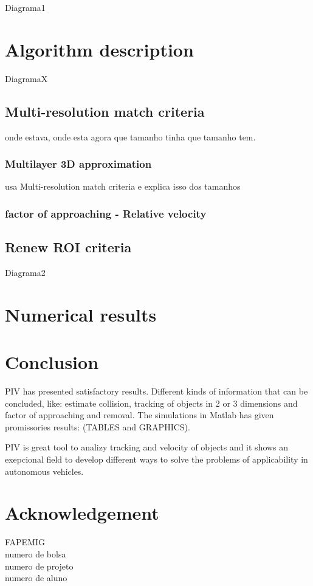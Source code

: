\documentclass[a4paper,10pt]{article}
\begin{document}
Diagrama1
\section{Algorithm description}
DiagramaX

\subsection{Multi-resolution match criteria}
onde estava, onde esta agora
que tamanho tinha que tamanho tem.
\subsubsection{Multilayer 3D approximation}
usa Multi-resolution match criteria e explica isso dos tamanhos

\subsubsection{factor of approaching - Relative velocity}


\subsection{Renew ROI criteria}
Diagrama2


\section{Numerical results}

\section{Conclusion}
PIV has presented satisfactory results. Different kinds of information that can be concluded, like: estimate collision, tracking of
objects in 2 or 3 dimensions and factor of approaching and removal. The simulations in Matlab has given promissories results: (TABLES
and GRAPHICS).

PIV is great tool to analizy tracking and velocity of objects and it shows an exepcional field to develop different ways to
solve the problems of applicability in autonomous vehicles.
\section{Acknowledgement}
FAPEMIG\\
numero de bolsa\\
numero de projeto\\
numero de aluno
\end{document}
